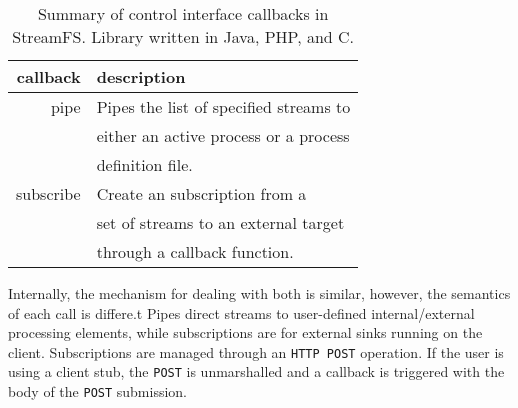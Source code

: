 \begin{table}[h]
\begin{center}
\begin{tabular}{| r | l |}
	\hline
	\textbf{callback} & \textbf{description} \\ \hline
	pipe & Pipes the list of specified streams to \\
		 & either an active process or a process \\
		 & definition file.    \\ \hline

	subscribe & Create an subscription from a 		 \\
			  & set of streams to an external target \\
			  & through a callback function. 		 \\ \hline

\end{tabular}
\caption{Summary of control interface callbacks in StreamFS.  Library written in Java, PHP, and C.}
\label{tab:api_calls3}
\end{center}
\end{table}

Internally, the mechanism for dealing with both is similar, however, the semantics of each call is differe.t %
Pipes direct streams to user-defined internal/external processing elements, while subscriptions are
for external sinks running on the client.  Subscriptions are managed through an \texttt{HTTP POST}
operation.  If the user is using a client stub, the \texttt{POST} is unmarshalled and a callback
is triggered with the body of the \texttt{POST} submission.





